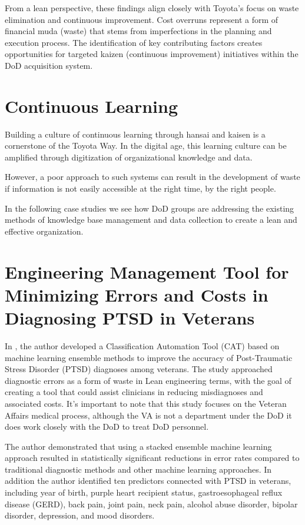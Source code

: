 \documentclass{article}
\begin{document}
			From a lean perspective, these findings align closely with Toyota's focus on waste elimination and continuous improvement. 
			Cost overruns represent a form of financial muda (waste) that stems from imperfections in the planning and execution process.
			The identification of key contributing factors creates opportunities for targeted kaizen (continuous improvement) initiatives within the DoD acquisition system.


	\section{Continuous Learning}

		Building a culture of continuous learning through hansai and kaisen is a cornerstone of the Toyota Way.
		In the digital age, this learning culture can be amplified through digitization of organizational knowledge and data.

		However, a poor approach to such systems can result in the development of waste if information is not easily accessible at the right time, by the right people.

		In the following case studies we see how DoD groups are addressing the existing methods of knowledge base management and data collection to create a lean and effective organization.

		\section{Engineering Management Tool for Minimizing Errors and Costs in Diagnosing PTSD in Veterans \cite{Le2023}}

		In \cite{Le2023}, the author developed a Classification Automation Tool (CAT) based on machine learning ensemble methods to improve the accuracy of Post-Traumatic Stress Disorder (PTSD) diagnoses among veterans. 
		The study approached diagnostic errors as a form of waste in Lean engineering terms, with the goal of creating a tool that could assist clinicians in reducing misdiagnoses and associated costs.
		It's important to note that this study focuses on the Veteran Affairs medical process, although the VA is not a department under the DoD it does work closely with the DoD to treat DoD personnel.

		The author demonstrated that using a stacked ensemble machine learning approach resulted in statistically significant reductions in error rates compared to traditional diagnostic methods and other machine learning approaches. 
		In addition the author identified ten predictors connected with PTSD in veterans, including year of birth, purple heart recipient status, gastroesophageal reflux disease (GERD), back pain, joint pain, neck pain, alcohol abuse disorder, bipolar disorder, depression, and mood disorders. 
\end{document}
